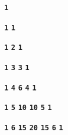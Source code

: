 \documentclass{article}
\begin{document}
\vfil


\hfil
\begin{minipage}{1.250000cm}
\textbf{\texttt{\Large 1}}
\end{minipage} 
\hfil
\par
\vfil



\hfil
\begin{minipage}{2.500000cm}
\textbf{\texttt{\Large 1}} \hfil \textbf{\texttt{\Large 1}}
\end{minipage} 
\hfil
\par
\vfil



\hfil
\begin{minipage}{3.750000cm}
\textbf{\texttt{\Large 1}} \hfil \textbf{\texttt{\Large 2}} \hfil \textbf{\texttt{\Large 1}}
\end{minipage} 
\hfil
\par
\vfil



\hfil
\begin{minipage}{5.000000cm}
\textbf{\texttt{\Large 1}} \hfil \textbf{\texttt{\Large 3}} \hfil \textbf{\texttt{\Large 3}} \hfil \textbf{\texttt{\Large 1}}
\end{minipage} 
\hfil
\par
\vfil



\hfil
\begin{minipage}{6.250000cm}
\textbf{\texttt{\Large 1}} \hfil \textbf{\texttt{\Large 4}} \hfil \textbf{\texttt{\Large 6}} \hfil \textbf{\texttt{\Large 4}} \hfil \textbf{\texttt{\Large 1}}
\end{minipage} 
\hfil
\par
\vfil



\hfil
\begin{minipage}{7.500000cm}
\textbf{\texttt{\Large 1}} \hfil \textbf{\texttt{\Large 5}} \hfil \textbf{\texttt{\Large 10}} \hfil \textbf{\texttt{\Large 10}} \hfil \textbf{\texttt{\Large 5}} \hfil \textbf{\texttt{\Large 1}}
\end{minipage} 
\hfil
\par
\vfil



\hfil
\begin{minipage}{8.750000cm}
\textbf{\texttt{\Large 1}} \hfil \textbf{\texttt{\Large 6}} \hfil \textbf{\texttt{\Large 15}} \hfil \textbf{\texttt{\Large 20}} \hfil \textbf{\texttt{\Large 15}} \hfil \textbf{\texttt{\Large 6}} \hfil \textbf{\texttt{\Large 1}}
\end{minipage} 
\hfil
\par
\vfil
\end{document}
